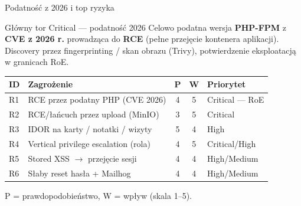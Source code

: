 \documentclass[aspectratio=169,11pt]{beamer}
\begin{document}
\begin{frame}{Podatność z 2026 i top ryzyka}
  \begin{block}{Główny tor Critical — podatność 2026}
    \footnotesize
    Celowo podatna wersja \textbf{PHP-FPM} z \textbf{CVE z 2026 r.} prowadząca do \textbf{RCE} (pełne przejęcie kontenera aplikacji). Discovery przez fingerprinting / skan obrazu (Trivy), potwierdzenie eksploatacją w granicach RoE.
  \end{block}

  \centering
  \footnotesize
  \begin{tabular}{@{}llccl@{}}
    \toprule
    \textbf{ID} & \textbf{Zagrożenie} & \textbf{P} & \textbf{W} & \textbf{Priorytet} \\
    \midrule
    R1 & RCE przez podatny PHP (CVE 2026) & 4 & 5 & \textcolor{crit}{Critical — RoE} \\
    R2 & RCE/łańcuch przez upload (MinIO) & 3 & 5 & \textcolor{crit}{Critical} \\
    R3 & IDOR na karty / notatki / wizyty & 5 & 4 & \textcolor{high}{High} \\
    R4 & Vertical privilege escalation (rola) & 4 & 5 & \textcolor{crit}{Critical/High} \\
    R5 & Stored XSS $\rightarrow$ przejęcie sesji & 4 & 4 & High/Medium \\
    R6 & Słaby reset hasła + Mailhog & 4 & 4 & High/Medium \\
    \bottomrule
  \end{tabular}

  \vspace{0.4em}
  {\footnotesize P = prawdopodobieństwo, W = wpływ (skala 1–5).}
\end{frame}
\end{document}
